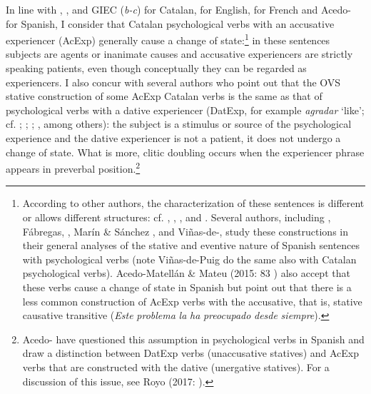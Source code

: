 \documentclass[output=paper,modfonts,nonflat]{langsci/langscibook}
\begin{document}
In line with \citet{Ynglès1991}, \citet{CabréMateu1998}, \citet{Rosselló2008} and GIEC (\textit{b-c}) for Catalan, \citet{Pesetsky1995} for English, \citet{Bouchard1995} for French and Acedo-\citet{MatellánMateu2015} for Spanish, I consider that Catalan psychological verbs with an accusative experiencer (AcExp) generally cause a change of state:\footnote{According to other authors, the characterization of these sentences is different or allows different structures: cf. \citet{Voorst1992}, \citet{Arad1999}, \citet{Landau2010}, \citet{MarínMcNally2011} and \citet{Fábregas2015}. Several authors, including \citet{FábregasMarín2012}, Fábregas, \citet{MarínMcNally2012}, Marín \& Sánchez \citet{Marco2012}, \citet{Ganeshan2014} and Viñas-de-\citet{Puig2014}, study these constructions in their general analyses of the stative and eventive nature of Spanish sentences with psychological verbs (note Viñas-de-Puig do the same also with Catalan psychological verbs). Acedo-Matellán \& Mateu (2015: 83 ) also accept that these verbs cause a change of state in Spanish but point out that there is a less common construction of AcExp verbs with the accusative, that is, stative causative transitive (\textit{Este} \textit{problema} \textit{la} \textit{ha} \textit{preocupado} \textit{desde} \textit{siempre}).} in these sentences subjects are agents or inanimate causes and accusative experiencers are strictly speaking patients, even though conceptually they can be regarded as experiencers. I also concur with several authors who point out that the OVS stative construction of some AcExp Catalan verbs is the same as that of psychological verbs with a dative experiencer (DatExp, for example \textit{agradar} ‘like’; cf. \citealt{CabréMateu1998}; \citealt{Ramos2004}; \citealt{Rosselló2008}; \citealt{Cuervo2010}, among others): the subject is a stimulus or source of the psychological experience and the dative experiencer is not a patient, it does not undergo a change of state. What is more, clitic doubling occurs when the experiencer phrase appears in preverbal position.\footnote{Acedo-\citet{MatellánMateu2015} have questioned this assumption in psychological verbs in Spanish and draw a distinction between DatExp verbs (unaccusative statives) and AcExp verbs that are constructed with the dative (unergative statives). For a discussion of this issue, see Royo (2017: ).}
\end{document}
